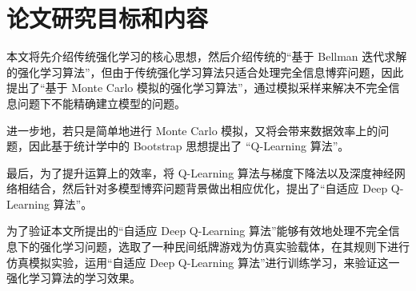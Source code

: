 \section{论文研究目标和内容}

本文将先介绍传统强化学习的核心思想，然后介绍传统的“基于 Bellman 迭代求解的强化学习算法”，但由于传统强化学习算法只适合处理完全信息博弈问题，因此提出了“基于 Monte Carlo 模拟的强化学习算法”，通过模拟采样来解决不完全信息问题下不能精确建立模型的问题。

进一步地，若只是简单地进行 Monte Carlo 模拟，又将会带来数据效率上的问题，因此基于统计学中的 Bootstrap 思想\cite{efron1994introduction}\cite{2014wzjstatistics}提出了 “Q-Learning 算法”。

最后，为了提升运算上的效率，将 Q-Learning 算法与梯度下降法以及深度神经网络相结合\cite{mnih2013playing}，然后针对多模型博弈问题背景做出相应优化，提出了“自适应 Deep Q-Learning 算法”。

为了验证本文所提出的“自适应 Deep Q-Learning 算法”能够有效地处理不完全信息下的强化学习问题，选取了一种民间纸牌游戏为仿真实验载体\cite{dahl2001reinforcement}，在其规则下进行仿真模拟实验，运用“自适应 Deep Q-Learning 算法”进行训练学习，来验证这一强化学习算法的学习效果。